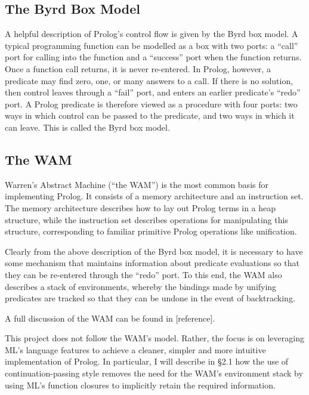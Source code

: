 \documentclass[12pt]{article}
\begin{document}
\subsection{The Byrd Box Model}


A helpful description of Prolog's control flow is given by the Byrd box model. 
A typical programming function can be modelled as a box with two ports: a ``call'' port for calling into the function and a ``success'' port when the function returns. 
Once a function call returns, it is never re-entered.
In Prolog, however, a predicate may find zero, one, or many answers to a call. 
If there is no solution, then control leaves through a ``fail'' port, and enters an earlier predicate's ``redo'' port.
A Prolog predicate is therefore viewed as a procedure with four ports: two ways in which control can be passed to the predicate, and two ways in which it can leave.
This is called the Byrd box model.

\subsection{The WAM}


Warren's Abstract Machine (``the WAM'') is the most common basis for implementing Prolog. 
It consists of a memory architecture and an instruction set. 
The memory architecture describes how to lay out Prolog terms in a heap structure, while the instruction set describes operations for manipulating this structure, corresponding to familiar primitive Prolog operations like unification. 

Clearly from the above description of the Byrd box model, it is necessary to have some mechanism that maintains information about predicate evaluations so that they can be re-entered through the ``redo'' port. 
To this end, the WAM also describes a stack of environments, whereby the bindings made by unifying predicates are tracked so that they can be undone in the event of backtracking. 

A full discussion of the WAM can be found in [reference].

This project does not follow the WAM's model. 
Rather, the focus is on leveraging ML's language features to achieve a cleaner, simpler and more intuitive implementation of Prolog. 
In particular, I will describe in \S2.1 how the use of continuation-passing style removes the need for the WAM's environment stack by using ML's function closures to implicitly retain the required information.
\end{document}
